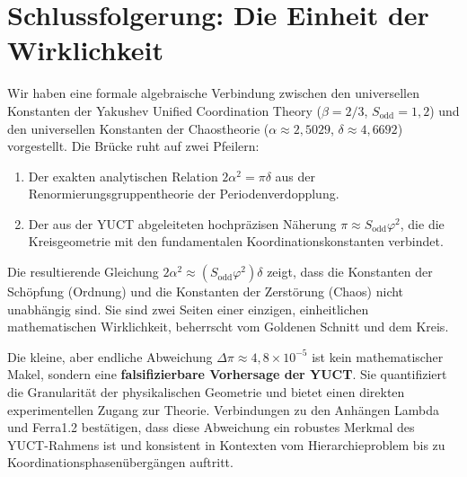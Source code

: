 \documentclass[12pt,a4paper]{article}
\begin{document}
	\section{Schlussfolgerung: Die Einheit der Wirklichkeit}
	
	Wir haben eine formale algebraische Verbindung zwischen den universellen Konstanten der Yakushev Unified Coordination Theory (\(\beta = 2/3\), \(S_{\mathrm{odd}} = 1{,}2\)) und den universellen Konstanten der Chaostheorie (\(\alpha \approx 2{,}5029\), \(\delta \approx 4{,}6692\)) vorgestellt. Die Brücke ruht auf zwei Pfeilern:
	\begin{enumerate}
		\item Der exakten analytischen Relation \(2\alpha^2 = \pi \delta\) aus der Renormierungsgruppentheorie der Periodenverdopplung.
		\item Der aus der YUCT abgeleiteten hochpräzisen Näherung \(\pi \approx S_{\mathrm{odd}}\varphi^2\), die die Kreisgeometrie mit den fundamentalen Koordinationskonstanten verbindet.
	\end{enumerate}
	
	Die resultierende Gleichung \(2\alpha^2 \approx (S_{\mathrm{odd}}\varphi^2)\delta\) zeigt, dass die Konstanten der Schöpfung (Ordnung) und die Konstanten der Zerstörung (Chaos) nicht unabhängig sind. Sie sind zwei Seiten einer einzigen, einheitlichen mathematischen Wirklichkeit, beherrscht vom Goldenen Schnitt und dem Kreis.
	
	Die kleine, aber endliche Abweichung \(\Delta\pi \approx 4{,}8\times10^{-5}\) ist kein mathematischer Makel, sondern eine \textbf{falsifizierbare Vorhersage der YUCT}. Sie quantifiziert die Granularität der physikalischen Geometrie und bietet einen direkten experimentellen Zugang zur Theorie. Verbindungen zu den Anhängen Lambda und Ferra1.2 bestätigen, dass diese Abweichung ein robustes Merkmal des YUCT-Rahmens ist und konsistent in Kontexten vom Hierarchieproblem bis zu Koordinationsphasenübergängen auftritt.
	
\end{document}
